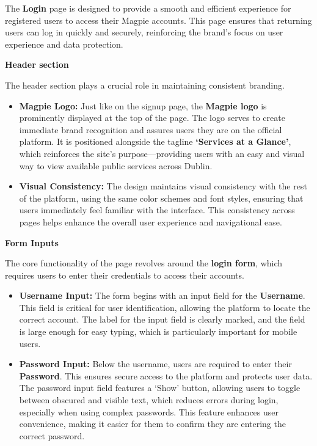 The \textbf{Login} page is designed to provide a smooth and efficient experience
for registered users to access their Magpie accounts. This page ensures that
returning users can log in quickly and securely, reinforcing the brand's focus
on user experience and data protection.

\newpage{}

\textbf{Header section}

The header section plays a crucial role in maintaining consistent branding.
\begin{itemize}
    \item{} \textbf{Magpie Logo:} Just like on the signup page, the
    \textbf{Magpie logo} is prominently displayed at the top of the page. The
    logo serves to create immediate brand recognition and assures users they are
    on the official platform. It is positioned alongside the tagline
    \textbf{`Services at a Glance'}, which reinforces the site's
    purpose—providing users with an easy and visual way to view available public
    services across Dublin.
    \item{} \textbf{Visual Consistency:} The design maintains visual consistency
    with the rest of the platform, using the same color schemes and font styles,
    ensuring that users immediately feel familiar with the interface. This
    consistency across pages helps enhance the overall user experience and
    navigational ease. 
\end{itemize}

\textbf{Form Inputs}

The core functionality of the page revolves around the \textbf{login form},
which requires users to enter their credentials to access their accounts.

\begin{itemize}
    \item{} \textbf{Username Input:} The form begins with an input field for the
    \textbf{Username}. This field is critical for user identification, allowing
    the platform to locate the correct account. The label for the input field is
    clearly marked, and the field is large enough for easy typing, which is
    particularly important for mobile users.
    \item{} \textbf{Password Input:} Below the username, users are required to
    enter their \textbf{Password}. This ensures secure access to the platform
    and protects user data. The password input field features a `Show' button,
    allowing users to toggle between obscured and visible text, which reduces
    errors during login, especially when using complex passwords. This feature
    enhances user convenience, making it easier for them to confirm they are
    entering the correct password.
\end{itemize}

